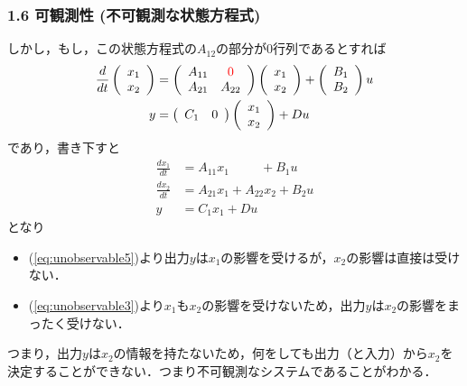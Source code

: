 \documentclass[10pt]{beamer}
\begin{document}
\begin{frame}[t]
\frametitle{1.6 可観測性 (不可観測な状態方程式)}
しかし，もし，この状態方程式の$A_{12}$の部分が$0$行列であるとすれば
\begin{align}
 \frac{d}{dt}
  \left(\begin{array}{c}
         {x}_1 \\
   {x}_2
  \end{array}\right)
  &=
  \left(\begin{array}{cc}
         {A}_{11} & \textcolor{red}{0} \\
       {A}_{21} & {A}_{22}
  \end{array}\right)
  \left(\begin{array}{c}
         {x}_1 \\
   {x}_2
  \end{array}\right)
  +
  \left(\begin{array}{c}
         {B}_1 \\
   {B}_2
  \end{array}\right)
  u
 \\
 y &=
  \left(\begin{array}{cc}
         {C}_1 & 0
  \end{array}\right)
  \left(\begin{array}{c}
         {x}_1 \\
   {x}_2
  \end{array}\right)
  + D u
 
\end{align}
であり，書き下すと 
\begin{align}
 \frac{dx_1}{dt} &= A_{11} x_1 \ \ \ \ \ \ \ \ \ \ \ + B_1 u
 \\
 \frac{dx_2}{dt} &= A_{21} x_1 + A_{22} x_2 + B_2 u
 \\
 y & = C_1 x_1 + Du
 
\end{align}
となり
\begin{itemize}
\item (\ref{eq:unobservable5})より出力$y$は$x_1$の影響を受けるが，$x_2$の影響は直接は受けない．
\item (\ref{eq:unobservable3})より$x_1$も$x_2$の影響を受けないため，出力$y$は$x_2$の影響をまったく受けない．
\end{itemize}
つまり，出力$y$は$x_2$の情報を持たないため，何をしても出力（と入力）から$x_2$を決定することができない．つまり不可観測なシステムであることがわかる．
\end{frame}
\end{document}

